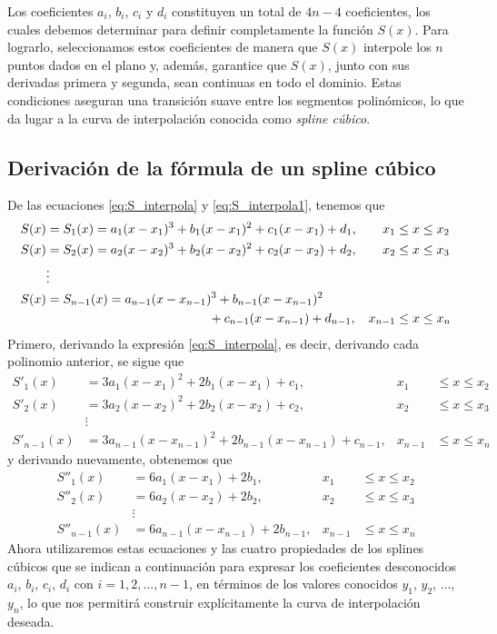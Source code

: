 \newpage

Los coeficientes $a_i$, $b_i$, $c_i$ y $d_i$ constituyen un total de $4n - 4$ coeficientes, los cuales debemos determinar para definir completamente la función $S(x)$. Para lograrlo, seleccionamos estos coeficientes de manera que $S(x)$ interpole los $n$ puntos dados en el plano y, además, garantice que $S(x)$, junto con sus derivadas primera y segunda, sean continuas en todo el dominio. Estas condiciones aseguran una transición suave entre los segmentos polinómicos, lo que da lugar a la curva de interpolación conocida como \emph{spline cúbico}.

\subsection*{Derivación de la fórmula de un spline cúbico}

De las ecuaciones \eqref{eq:S_interpola} y \eqref{eq:S_interpola1}, tenemos que
\begin{align*}
    S(x) & = S_1(x) = a_1(x - x_1)^3 + b_1(x - x_1)^2 + c_1(x - x_1) + d_1, & x_1 & \leq x \leq x_2 \\
    S(x) & = S_2(x) = a_2(x - x_2)^3 + b_2(x - x_2)^2 + c_2(x - x_2) + d_2, & x_2 & \leq x \leq x_3 \\
    & \vdots & & \\
    S(x) & = S_{n-1}(x) = a_{n-1}(x - x_{n-1})^3 + b_{n-1}(x - x_{n-1})^2 & & \\
    & \hspace{4.5cm} + c_{n-1}(x - x_{n-1}) + d_{n-1}, & x_{n-1} & \leq x \leq x_n
\end{align*}
Primero, derivando la expresión \eqref{eq:S_interpola}, es decir, derivando cada polinomio anterior, se sigue que
\begin{equation}
    \begin{aligned}
        S'_1(x) & = 3a_1(x - x_1)^2 + 2b_1(x - x_1) + c_1, & x_1 & \leq x \leq x_2 \\
        S'_2(x) & = 3a_2(x - x_2)^2 + 2b_2(x - x_2) + c_2, & x_2 & \leq x \leq x_3 \\
        & \vdots & & \\
        S'_{n-1}(x) & = 3a_{n-1}(x - x_{n-1})^2 + 2b_{n-1}(x - x_{n-1}) + c_{n-1}, & x_{n-1} & \leq x \leq x_n
    \end{aligned}
\end{equation}
y derivando nuevamente, obtenemos que
\begin{align*}
    S''_1(x) & = 6a_1(x - x_1) + 2b_1, & x_1 & \leq x \leq x_2 \\
    S''_2(x) & = 6a_2(x - x_2) + 2b_2, & x_2 & \leq x \leq x_3 \\
    & \vdots & & \\
    S''_{n-1}(x) & = 6a_{n-1}(x - x_{n-1}) + 2b_{n-1}, & x_{n-1} & \leq x \leq x_n
\end{align*}
Ahora utilizaremos estas ecuaciones y las cuatro propiedades de los splines cúbicos que se indican a continuación para expresar los coeficientes desconocidos $a_i$, $b_i$, $c_i$, $d_i$ con $i = 1, 2, \dots, n - 1$, en términos de los valores conocidos $y_1$, $y_2$, $\dots$, $y_n$, lo que nos permitirá construir explícitamente la curva de interpolación deseada.

